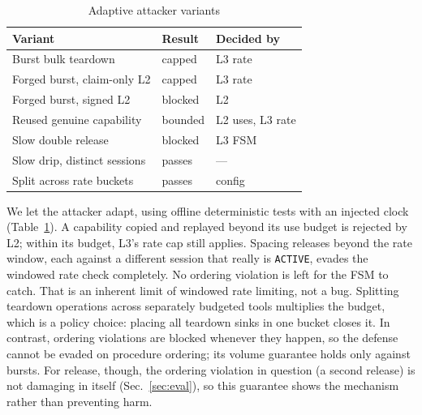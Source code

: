 \documentclass[conference]{IEEEtran}
\newcommand{\code}[1]{\texttt{\small #1}}
\begin{document}
\begin{table}[t]
\centering
\caption{Adaptive attacker variants}
\label{tab:adaptive}
\setlength{\tabcolsep}{4pt}
\begin{tabular}{@{}lll@{}}
\toprule
Variant & Result & Decided by \\
\midrule
Burst bulk teardown & capped & L3 rate \\
Forged burst, claim-only L2 & capped & L3 rate \\
Forged burst, signed L2 & \textcolor{gwgreen}{blocked} & L2 \\
Reused genuine capability & bounded & L2 uses, L3 rate \\
Slow double release & \textcolor{gwgreen}{blocked} & L3 FSM \\
Slow drip, distinct sessions & \textcolor{gwred}{passes} & --- \\
Split across rate buckets & \textcolor{gwred}{passes} & config \\
\bottomrule
\end{tabular}
\end{table}

We let the attacker adapt, using offline deterministic tests with an injected clock
(Table~\ref{tab:adaptive}). A capability copied and replayed beyond its use budget is
rejected by L2; within its budget, L3's rate cap still applies. Spacing releases beyond the rate window, each against a
different session that really is \code{ACTIVE}, evades the windowed rate check completely.
No ordering violation is left for the FSM to catch. That is an inherent limit of windowed
rate limiting, not a bug. Splitting teardown operations across separately budgeted tools
multiplies the budget, which is a policy choice: placing all teardown sinks in one bucket
closes it. In contrast, ordering violations are blocked whenever they happen, so the defense
cannot be evaded on procedure ordering; its volume guarantee holds only against bursts. For
release, though, the ordering violation in question (a second release) is not damaging in itself
(Sec.~\ref{sec:eval}), so this guarantee shows the mechanism rather than preventing harm.
\end{document}
